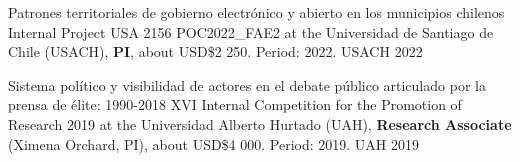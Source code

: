 \vspace{1mm}

\begin{cvhonors}
\cvhonor
{Patrones territoriales de gobierno electrónico y abierto en los municipios chilenos}
{Internal Project USA 2156 POC2022\_FAE2 at the Universidad de Santiago de Chile (USACH), {\bfseries PI}, about USD\$2 250. Period: 2022.} %
{USACH}
{2022}
\end{cvhonors}

\vspace{1mm}

\begin{cvhonors}
\cvhonor
{Sistema político y visibilidad de actores en el debate público articulado por la prensa de élite: 1990-2018}
{XVI Internal Competition for the Promotion of Research 2019 at the Universidad Alberto Hurtado (UAH), {\bfseries Research Associate} (Ximena Orchard, PI), about USD\$4 000. Period: 2019.} %
{UAH}
{2019}
\end{cvhonors}

\vspace{1mm}
\pagebreak

